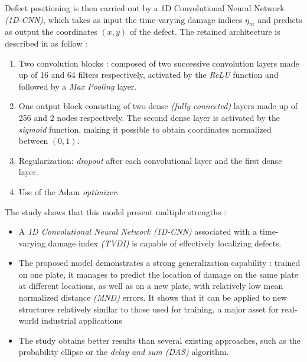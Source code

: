 \documentclass[12pt]{article}
\begin{document}
\vspace{10pt}
 
Defect positioning is then carried out by a 1D Convolutional Neural Network \textit{(1D-CNN)}, which takes as input the time-varying damage indices $\eta_m $ and predicts as output the coordinates $(x,y)$ of the defect. The retained architecture is described in \cite{ZHANG2021107107} as follow : 
 
\begin{enumerate}[itemsep=8pt]
    
    \item Two convolution blocks : composed of two successive convolution layers made up of 16 and 64 filters respectively, activated by the \textit{ReLU} function and followed by a \textit{Max Pooling} layer.
    
    \item One output block consisting of two dense \textit{(fully-connected)} layers made up of 256 and 2 nodes respectively. The second dense layer is activated by the \textit{sigmoid} function, making it possible to obtain coordinates normalized between $(0,1)$.
    
    \item Regularization: \textit{dropout} after each convolutional layer and the first dense layer.
 
    \item Use of the Adam \textit{optimizer}.
    
\end{enumerate}
 
The study shows that this model present multiple strengths :

\begin{itemize}[itemsep=8pt]

    \item A \textit{1D Convolutional Neural Network (1D-CNN)} associated with a time-varying damage index \textit{(TVDI)} is capable of effectively localizing defects.

    \item The proposed model demonstrates a strong generalization capability : trained on one plate, it manages to predict the location of damage on the same plate at different locations, as well as on a new plate, with relatively low mean normalized distance \textit{(MND)} errors. It shows that it can be applied to new structures relatively similar to those used for training, a major asset for real-world industrial applications
    
    \item The study obtains better results than several existing approaches, such as the probability ellipse or the \textit{delay and sum (DAS)} algorithm.
    
\end{itemize}
 
\end{document}
